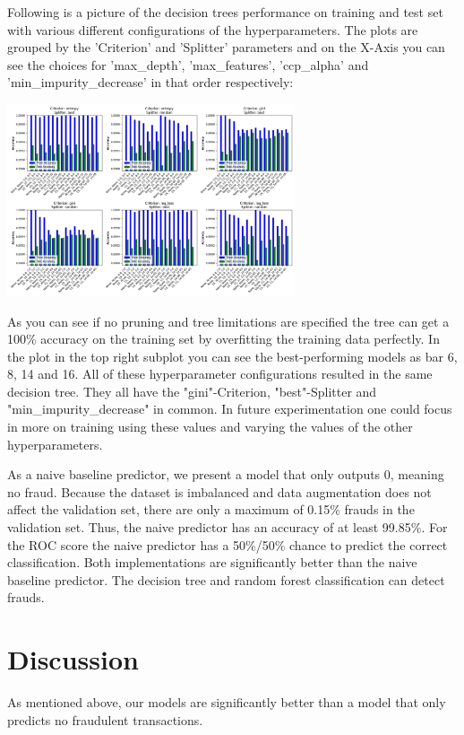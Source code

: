 \documentclass[a4paper, 10pt, conference]{ieeeconf}      %
\begin{document}
Following is a picture of the decision trees performance on training and test set with various different configurations of the hyperparameters. The plots are grouped by the 'Criterion' and 'Splitter' parameters and on the X-Axis you can see the choices for 'max\_depth', 'max\_features', 'ccp\_alpha' and 'min\_impurity\_decrease' in that order respectively:

\begin{center}
  \includegraphics[width=8.5cm]{../data/accuracy_plot.png} \label{accuracy-plot}
\end{center}

As you can see if no pruning and tree limitations are specified the tree can get a 100\% accuracy on the training set by overfitting the training data perfectly.
In the plot in the top right subplot you can see the best-performing models as bar 6, 8, 14 and 16. All of these hyperparameter configurations resulted in the same decision tree. 
They all have the "gini"-Criterion, "best"-Splitter and "min\_impurity\_decrease" in common. 
In future experimentation one could focus in more on training using these values and varying the values of the other hyperparameters.

As a naive baseline predictor, we present a model that only outputs 0, meaning no fraud. 
Because the dataset is imbalanced and data augmentation does not affect the validation set, there are only a maximum of 0.15\% frauds in the validation set. 
Thus, the naive predictor has an accuracy of at least 99.85\%. For the ROC score the naive predictor has a 50\%/50\% chance to predict the correct classification.
Both implementations are significantly better than the naive baseline predictor. The decision tree and random forest classification can detect frauds.

\section{Discussion}
\label{sec:discuss}
As mentioned above, our models are significantly better than a model that only predicts no fraudulent transactions.
\end{document}
